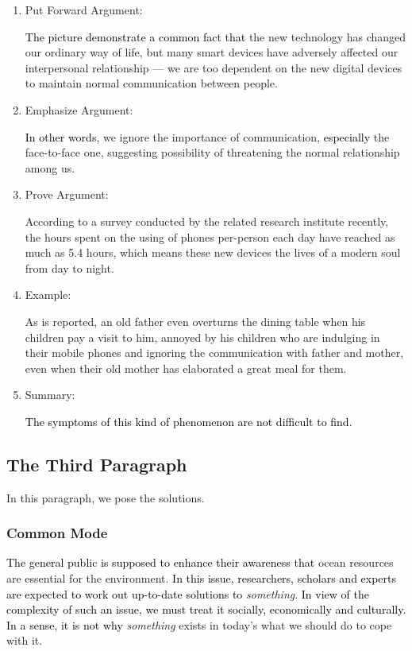 \documentclass{article}
\begin{document}
\begin{enumerate}
\item Put Forward Argument:
  \par \textcolor{black}{The picture demonstrate a common fact that }the new technology has
  changed our ordinary way of life, but many smart devices have adversely affected our
  interpersonal relationship --- we are too dependent on the new digital devices to maintain
  normal communication between people.
  
\item Emphasize Argument:
  \par \textcolor{black}{In other words, }we ignore the importance of communication,
  \textcolor{black}{especially }the face-to-face one, suggesting possibility of threatening the
  normal relationship among us.

\item Prove Argument:
  \par According to a survey conducted by the related research institute recently, the
  hours spent on the using of phones per-person each day have reached as much as 5.4
  hours, which means these new devices the lives of a modern soul from day to night.

\item Example:
  \par As is reported, an old father even overturns the dining table when his children pay
  a visit to him, annoyed by his children who are indulging in their mobile phones and
  ignoring the communication with father and mother, even when their old mother has
  elaborated a great meal for them.

\item Summary:
  \par \textcolor{black}{The symptoms of this kind of phenomenon are not difficult to find}.
\end{enumerate}

\subsection{The Third Paragraph}
\label{sec:third-paragraph}

In this paragraph, we pose the solutions.

\subsubsection{Common Mode}
\label{sec:common-mode}

\hspace{0.4cm} \textcolor{black}{The general public is supposed to enhance their awareness that} ocean resources are
essential for the environment. \textcolor{black}{In this issue, researchers, scholars and experts are
expected to work out up-to-date solutions to} \emph{something}. \textcolor{black}{In view of
the complexity of such an issue, we must treat it socially, economically and
culturally. In a sense, it is not why } \emph {something} exists in today's what we should
do to cope with it.
\end{document}

